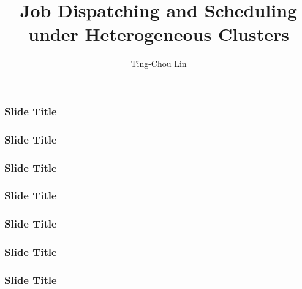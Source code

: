 \documentclass{beamer}
\title{Job Dispatching and Scheduling under Heterogeneous Clusters}
\author{Ting-Chou Lin}
\begin{document}
\begin{frame}
  \titlepage
\end{frame}
\begin{frame}
  \frametitle{Slide Title}
\end{frame}
\begin{frame}
  \frametitle{Slide Title}
\end{frame}
\begin{frame}
  \frametitle{Slide Title}
\end{frame}
\begin{frame}
  \frametitle{Slide Title}
\end{frame}
\begin{frame}
  \frametitle{Slide Title}
\end{frame}
\begin{frame}
  \frametitle{Slide Title}
\end{frame}
\begin{frame}
  \frametitle{Slide Title}
\end{frame}
\end{document}
